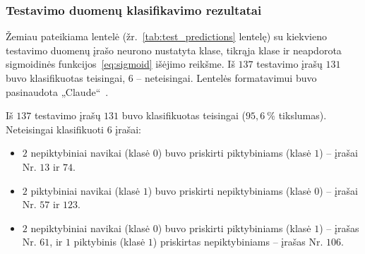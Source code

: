 \subsubsection{Testavimo duomenų klasifikavimo rezultatai}

Žemiau pateikiama lentelė (žr.~\ref{tab:test_predictions} lentelę) su kiekvieno testavimo duomenų įrašo neurono nustatyta klase, tikrąja klase ir neapdorota sigmoidinės funkcijos~\eqref{eq:sigmoid} išėjimo reikšme. Iš $137$ testavimo įrašų $131$ buvo klasifikuotas teisingai, $6$ – neteisingai. Lentelės formatavimui buvo pasinaudota „Claude“~\cite{claude_bendrai}.



Iš $137$ testavimo įrašų $131$ buvo klasifikuotas teisingai ($95{,}6\ \%$ tikslumas). Neteisingai klasifikuoti $6$ įrašai:
\begin{itemize}
    \item $2$ nepiktybiniai navikai (klasė $0$) buvo priskirti piktybiniams (klasė $1$) – įrašai Nr. $13$ ir $74$.
    \item $2$ piktybiniai navikai (klasė $1$) buvo priskirti nepiktybiniams (klasė $0$) – įrašai Nr. $57$ ir $123$.
    \item $2$ nepiktybiniai navikai (klasė $0$) buvo priskirti piktybiniams (klasė $1$) – įrašas Nr. $61$, ir $1$ piktybinis (klasė $1$) priskirtas nepiktybiniams – įrašas Nr. $106$.
\end{itemize}
